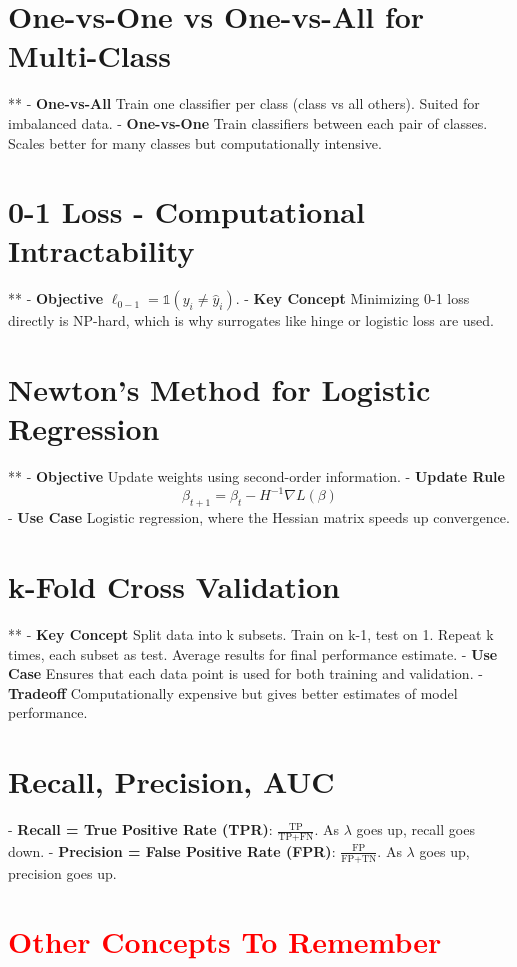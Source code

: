 \documentclass[10pt]{article}
\begin{document}
\begin{multicols}{2}
\section*{One-vs-One vs One-vs-All for Multi-Class}**
- \textbf{One-vs-All} Train one classifier per class (class vs all others). Suited for imbalanced data.
- \textbf{One-vs-One} Train classifiers between each pair of classes. Scales better for many classes but computationally intensive.

\section*{0-1 Loss - Computational Intractability}**
- \textbf{Objective} $\ell_{0-1} = \mathbb{1}(y_i \neq \hat{y}_i)$.
- \textbf{Key Concept} Minimizing 0-1 loss directly is NP-hard, which is why surrogates like hinge or logistic loss are used.

\section*{Newton's Method for Logistic Regression}**
- \textbf{Objective} Update weights using second-order information.
- \textbf{Update Rule} 
  \[
  \beta_{t+1} = \beta_t - H^{-1} \nabla L(\beta)
  \]
- \textbf{Use Case} Logistic regression, where the Hessian matrix speeds up convergence.

\section*{k-Fold Cross Validation}**
- \textbf{Key Concept} Split data into k subsets. Train on k-1, test on 1. Repeat k times, each subset as test. Average results for final performance estimate.
- \textbf{Use Case} Ensures that each data point is used for both training and validation.
- \textbf{Tradeoff} Computationally expensive but gives better estimates of model performance.


\section*{Recall, Precision, AUC}
- \textbf{Recall = True Positive Rate (TPR)}: $\frac{\text{TP}}{\text{TP} + \text{FN}}$. As $\lambda$ goes up, recall goes down.
- \textbf{Precision = False Positive Rate (FPR)}: $\frac{\text{FP}}{\text{FP} + \text{TN}}$. As $\lambda$ goes up, precision goes up.

\section*{\textcolor{red}{Other Concepts To Remember}}


\end{multicols}
\end{document}
